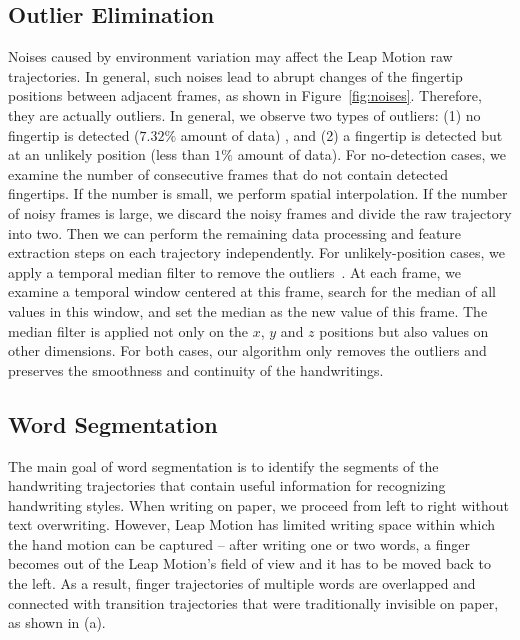 \subsection{Outlier Elimination}
Noises caused by environment variation may affect the Leap Motion raw trajectories. In general, such noises lead to abrupt changes of the fingertip positions between adjacent frames, as shown in Figure~\ref{fig:noises}. 
Therefore, they are actually outliers. In general, we observe two types of outliers: (1) no fingertip is detected ($7.32\%$ amount of data) , and (2) a fingertip is detected but at an unlikely position (less than $1\%$ amount of data). For no-detection cases, we examine the number of consecutive frames that do not contain detected fingertips. If the number is small, we perform spatial interpolation. If the number of noisy frames is large, we discard the noisy frames and divide the raw trajectory into two. 
Then we can perform the remaining data processing and feature extraction steps on each trajectory independently. 
For unlikely-position cases, we apply a temporal median filter to remove the outliers~\cite{SaltNoise}. 
At each frame, we examine a temporal window centered at this frame, search for the median of all values in this window,  and set the median as the new value of this frame. 
The median filter is applied not only on the $x$, $y$ and $z$ positions but also values on other dimensions. For both cases, our algorithm only removes the outliers and preserves the smoothness and continuity of the handwritings. 








 \subsection{Word Segmentation}

The main goal of word segmentation is to identify the segments of the handwriting trajectories that contain useful information for recognizing handwriting styles. 
When writing on paper, we proceed from  left to right %
without text overwriting. %
However, Leap Motion has limited writing space within which the hand motion can be captured -- after writing one or two words, a finger becomes out of the Leap Motion's field of view and it has to be moved back to the left.
As a result, finger trajectories of multiple words are overlapped and connected with transition trajectories that were traditionally invisible on paper, as shown in  (a). %

